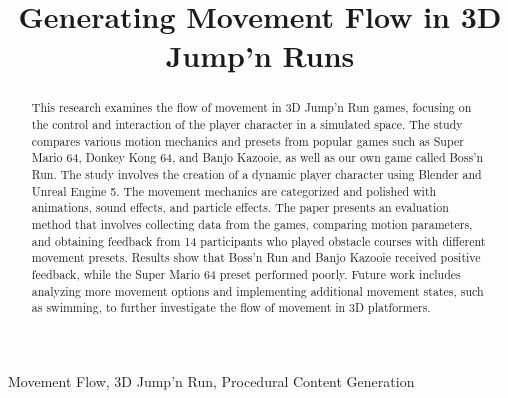 \documentclass[conference]{IEEEtran}
\begin{document}
\title{Generating Movement Flow in 3D Jump'n Runs}

\author{
\and
{}
\and
{}
}

\maketitle

\begin{abstract}
    This research examines the flow of movement in 3D Jump'n Run games, focusing on the control and interaction of the player character in a simulated space. 
    The study compares various motion mechanics and presets from popular games such as Super Mario 64, Donkey Kong 64, and Banjo Kazooie, as well as our own game called Boss'n Run. 
    The study involves the creation of a dynamic player character using Blender and Unreal Engine 5. 
    The movement mechanics are categorized and polished with animations, sound effects, and particle effects. 
    The paper presents an evaluation method that involves collecting data from the games, comparing motion parameters, and obtaining feedback from 14 participants who played obstacle courses with different movement presets. 
    Results show that Boss'n Run and Banjo Kazooie received positive feedback, while the Super Mario 64 preset performed poorly. 
    Future work includes analyzing more movement options and implementing additional movement states, such as swimming, to further investigate the flow of movement in 3D platformers.
\end{abstract}

\begin{IEEEkeywords}
Movement Flow, 3D Jump'n Run, Procedural Content Generation
\end{IEEEkeywords}
\end{document}
